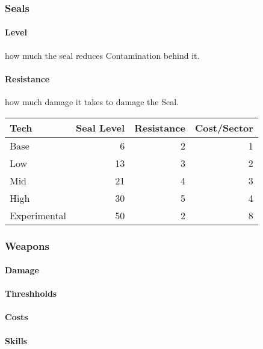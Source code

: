 \subsubsection{Seals}\label{subsubsec:seals}
\paragraph{Level} how much the seal reduces Contamination behind it.
\paragraph{Resistance} how much damage it takes to damage the Seal.

\begin{tabular}{l|r|r|r}
    Tech & Seal Level & Resistance & Cost/Sector\\\hline
    Base &  6 & 2 & 1\\
    Low &   13& 3 & 2\\
    Mid &   21& 4 & 3\\
    High &  30& 5 & 4\\
    Experimental& 50 & 2 &8\\
\end{tabular}\par

\subsubsection{Weapons}\label{sec:weapons}
\paragraph{Damage}
\paragraph{Threshholds}
\paragraph{Costs}
\paragraph{Skills}

